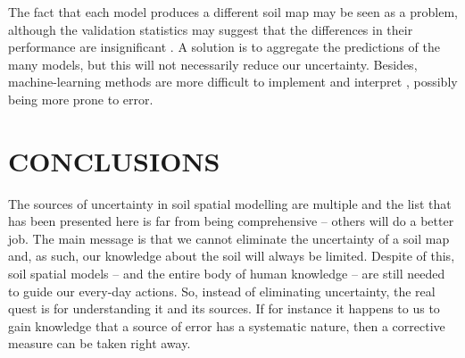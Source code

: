 
The fact that each model produces a different soil map may be seen as a problem, although the validation 
statistics may suggest that the differences in their performance are insignificant \cite{HeungEtAl2016}. A 
solution is to aggregate the predictions of the many models, but this will not necessarily reduce our 
uncertainty. Besides, machine-learning methods are more difficult to implement and interpret 
\cite{Grunwald2009}, possibly being more prone to error.

\section{CONCLUSIONS}

The sources of uncertainty in soil spatial modelling are multiple and the list that has been presented here
is far from being comprehensive -- others will do a better job. The main message is that we cannot 
eliminate the uncertainty of a soil map and, as such, our knowledge about the soil will always
be limited. Despite of this, soil spatial models -- and the entire body of human knowledge -- are still
needed to guide our every-day actions. So, instead of eliminating uncertainty, the real quest is for
understanding it and its sources. If for instance it happens to us to gain knowledge that a source of 
error has a systematic nature, then a corrective measure can be taken right away.



